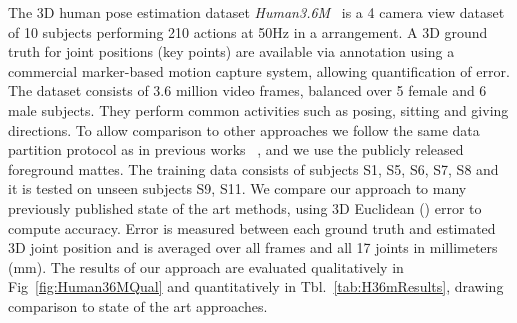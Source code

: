 \documentclass[runningheads]{llncs}
\begin{document}
The 3D human pose estimation dataset {\em Human3.6M}~\cite{h36m_pami} is a 4 camera view dataset of 10 subjects performing 210 actions at 50Hz in a  arrangement. A 3D ground truth for joint positions (key points) are available via annotation using  a commercial marker-based motion capture system, allowing quantification of error. The dataset consists of 3.6 million video frames, balanced over 5 female and 6 male subjects. They perform common activities such as posing, sitting and giving directions. To allow comparison to other approaches we follow the same data partition protocol as in previous works ~\cite{h36m_pami,li2015maximumH36m,tekin2016fusingH36m,lin2017CVPRRPSM,tome2017liftingH36m,martinez_simple_2017}, and we use the publicly released foreground mattes. 
The training data consists of subjects S1, S5, S6, S7, S8 and it is tested on unseen subjects S9, S11.  We compare our approach to many previously published state of the art methods, using 3D Euclidean () error  to compute accuracy. Error is measured between each ground truth and estimated 3D joint position and is averaged over all frames and all 17 joints in millimeters (mm). The results of our approach  are evaluated  qualitatively in Fig~\ref{fig:Human36MQual} and quantitatively in Tbl.~\ref{tab:H36mResults}, drawing comparison to state of the art approaches.
\end{document}
